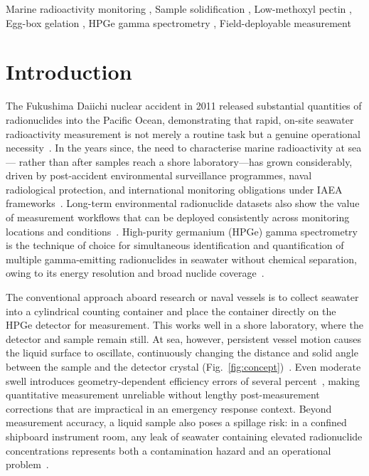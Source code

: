 \documentclass[preprint,12pt]{elsarticle}
\begin{document}
\begin{frontmatter}
\begin{keyword}
Marine radioactivity monitoring \sep
Sample solidification \sep
Low-methoxyl pectin \sep
Egg-box gelation \sep
HPGe gamma spectrometry \sep
Field-deployable measurement
\end{keyword}

\end{frontmatter}
\linenumbers

\section{Introduction}

The Fukushima Daiichi nuclear accident in 2011 released substantial quantities
of radionuclides into the Pacific Ocean, demonstrating that rapid, on-site
seawater radioactivity measurement is not merely a routine task but a genuine
operational necessity~\cite{Buesseler2012, Lu2021}.
In the years since, the need to characterise marine radioactivity at sea---
rather than after samples reach a shore laboratory---has grown considerably,
driven by post-accident environmental surveillance programmes,
naval radiological protection, and international monitoring obligations
under IAEA frameworks~\cite{IAEA2005, Abbasi2021, Uddin2020}.
Long-term environmental radionuclide datasets also show the value of
measurement workflows that can be deployed consistently across monitoring
locations and conditions~\cite{Bae2025}.
High-purity germanium (HPGe) gamma spectrometry is the technique of choice
for simultaneous identification and quantification of multiple gamma-emitting
radionuclides in seawater without chemical separation, owing to its energy
resolution and broad nuclide coverage~\cite{Jerome2014, Debertin1988}.

The conventional approach aboard research or naval vessels is to collect
seawater into a cylindrical counting container and place the container
directly on the HPGe detector for measurement.
This works well in a shore laboratory, where the detector and sample remain
still.
At sea, however, persistent vessel motion causes the liquid surface to oscillate,
continuously changing the distance and solid angle between the sample and the
detector crystal (Fig.~\ref{fig:concept})~\cite{Corbacho2022, Choi2024}.
Even moderate swell introduces geometry-dependent efficiency errors of several
percent~\cite{Barrera2017}, making quantitative measurement
unreliable without lengthy post-measurement corrections that are impractical
in an emergency response context.
Beyond measurement accuracy, a liquid sample also poses a spillage risk:
in a confined shipboard instrument room, any leak of seawater containing
elevated radionuclide concentrations represents both a contamination hazard
and an operational problem~\cite{Lu2021, Choi2023}.
\end{document}
